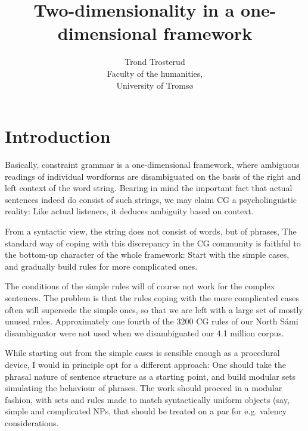 \documentclass[a4paper,english]{article} %
\begin{document}

\title{Two-dimensionality in a one-dimensional framework}
\author{Trond Trosterud\\ 
Faculty of the humanities, \\
University of Tromsø \\
}


\maketitle 


\section{Introduction}

Basically, constraint grammar is a one-dimensional framework, where ambiguous readings of individual wordforms are disambiguated on the basis of the right and left context of the word string. Bearing in mind the important fact that actual sentences indeed do consist of such strings, we may claim CG a psycholinguistic reality: Like actual listeners, it deduces ambiguity based on context.%

From a syntactic view, the string does not consist of words, but of phrases, The standard way of coping with this discrepancy in the CG community is faithful to the bottom-up character of the whole framework: Start with the simple cases, and gradually build rules for more complicated ones.%

The conditions of the simple rules will of course not work for the complex sentences. The problem is that the rules coping with the more complicated cases often will supersede the simple ones, so that we are left with a large set of mostly unused rules. Approximately one fourth of the 3200 CG rules of our North Sámi disambiguator were not used when we disambiguated our 4.1 million corpus.%

While starting out from the simple cases is sensible enough as a procedural device, I would in principle opt for a different approach: One should take the phrasal nature of sentence structure as a starting point, and build modular sets simulating the behaviour of phrases. The work should proceed in a modular fashion, with sets and rules made to match syntactically uniform objects (say, simple and complicated NPs, that should be treated on a par for e.g. valency considerations. %
\end{document}
